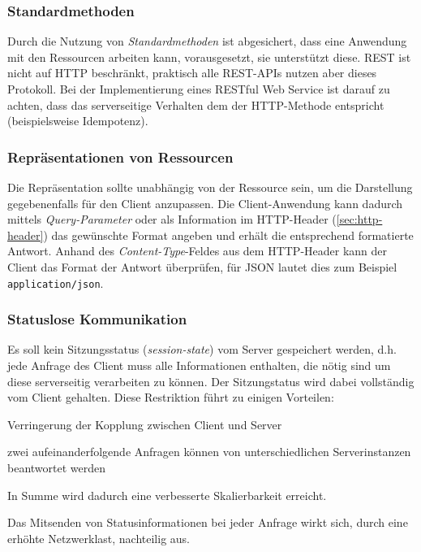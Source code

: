 \subsubsection{Standardmethoden}
\label{sec:standardmethods}

Durch die Nutzung von \emph{Standardmethoden} ist abgesichert, dass eine Anwendung mit den Ressourcen arbeiten kann, vorausgesetzt, sie unterstützt diese. \gls{REST} ist nicht auf \gls{HTTP} beschränkt, praktisch alle \gls{REST}-\glspl{API} nutzen aber dieses Protokoll. Bei der Implementierung eines \gls{RESTful} Web Service ist darauf zu achten, dass das serverseitige Verhalten dem der HTTP-Methode entspricht (beispielsweise Idempotenz).

\subsubsection{Repräsentationen von Ressourcen}
\label{sec:representationofresources}

Die Repräsentation sollte unabhängig von der Ressource sein, um die Darstellung gegebenenfalls für den Client anzupassen. 
Die Client-Anwendung kann dadurch mittels \emph{Query-Parameter} oder als Information im \gls{HTTP}-Header (\cref{sec:http-header}) das gewünschte Format angeben und erhält die entsprechend formatierte Antwort.
Anhand des \emph{Content-Type}-Feldes aus dem \gls{HTTP}-Header kann der Client das Format der Antwort überprüfen, für \gls{JSON} lautet dies zum Beispiel \texttt{application/json}.

\subsubsection{Statuslose Kommunikation}
\label{sec:stateless_communication}

Es soll kein Sitzungsstatus (\emph{session-state}) vom Server gespeichert werden, d.h. jede Anfrage des Client muss alle Informationen enthalten, die nötig sind um diese serverseitig verarbeiten zu können. Der Sitzungstatus wird dabei vollständig vom Client gehalten. 
Diese Restriktion führt zu einigen Vorteilen:
\begin{compactitem}
    \item Verringerung der Kopplung zwischen Client und Server
    \item zwei aufeinanderfolgende Anfragen können von unterschiedlichen Serverinstanzen beantwortet werden
\end{compactitem}
In Summe wird dadurch eine verbesserte Skalierbarkeit erreicht.

Das Mitsenden von Statusinformationen bei jeder Anfrage wirkt sich, durch eine erhöhte Netzwerklast, nachteilig aus.
